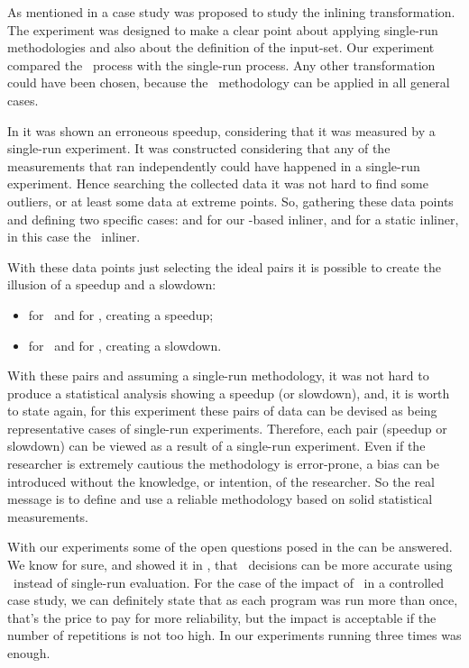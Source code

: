 
As mentioned in  a case study was proposed to study the inlining transformation. The experiment was designed to make a clear point about applying single-run methodologies and also about the definition of the input-set. Our experiment compared the \CP\ process with the single-run process. Any other transformation could have been chosen, because the \CP\ methodology can be applied in all general cases.

In  it was shown an erroneous speedup, considering that it was measured by a single-run experiment. It was constructed considering that any of the measurements that ran independently could have happened in a single-run experiment. Hence searching the collected data it was not hard to find some outliers, or at least some data at extreme points. So, gathering these data points and defining two specific cases:  and  for our \FDO-based inliner, and for a static inliner, in this case the \llvm\ inliner.

With these data points just selecting the ideal pairs it is possible to create the illusion of a speedup and a slowdown:
\begin{itemize}
 \item {} for \FDO\ and  for \llvm, creating a speedup;
 \item {} for \FDO\ and  for \llvm, creating a slowdown.
\end{itemize}

With these pairs and assuming a single-run methodology, it was not hard to produce a statistical analysis showing a speedup (or slowdown), and, it is worth to state again, for this experiment these pairs of data can be devised as being representative cases of single-run experiments. Therefore, each pair (speedup or slowdown) can be viewed as a result of a single-run experiment. Even if the researcher is extremely cautious the methodology is error-prone, a bias can be introduced without the knowledge, or intention, of the researcher. So the real message is to define and use a reliable methodology based on solid statistical measurements.

With our experiments some of the open questions posed in the  can be answered. We know for sure, and showed it in , that \FDI\ decisions can be more accurate using \CP\ instead of single-run evaluation. For the case of the impact of \CP\ in a controlled case study, we can definitely state that as each program was run more than once, that's the price to pay for more reliability, but the impact is acceptable if the number of repetitions is not too high. In our experiments running three times was enough.

